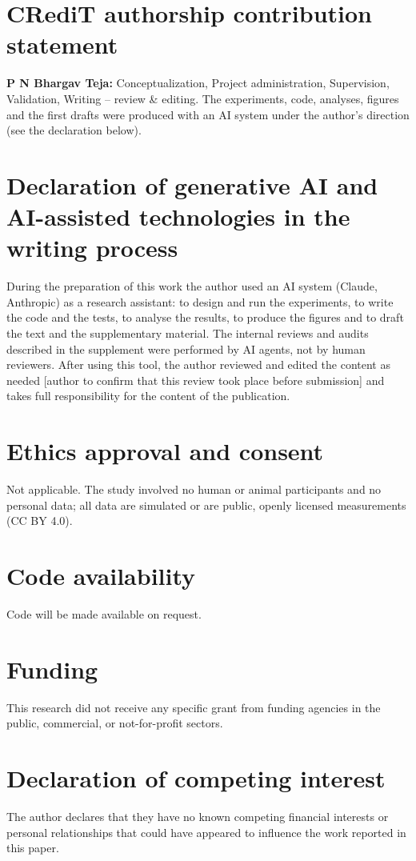 \section*{CRediT authorship contribution statement}
\textbf{P N Bhargav Teja:} Conceptualization, Project administration, Supervision, Validation, Writing -- review \& editing. The experiments, code, analyses, figures and the first drafts were produced with an AI system under the author's direction (see the declaration below).
\section*{Declaration of generative AI and AI-assisted technologies in the writing process}
During the preparation of this work the author used an AI system (Claude, Anthropic) as a research assistant: to design and run the experiments, to write the code and the tests, to analyse the results, to produce the figures and to draft the text and the supplementary material. The internal reviews and audits described in the supplement were performed by AI agents, not by human reviewers. After using this tool, the author reviewed and edited the content as needed [author to confirm that this review took place before submission] and takes full responsibility for the content of the publication.
\section*{Ethics approval and consent}
Not applicable. The study involved no human or animal participants and no personal data; all data are simulated or are public, openly licensed measurements (CC BY 4.0).
\section*{Code availability}
Code will be made available on request.
\section*{Funding}
This research did not receive any specific grant from funding agencies in the public, commercial, or not-for-profit sectors.
\section*{Declaration of competing interest}
The author declares that they have no known competing financial interests or personal relationships that could have appeared to influence the work reported in this paper.
